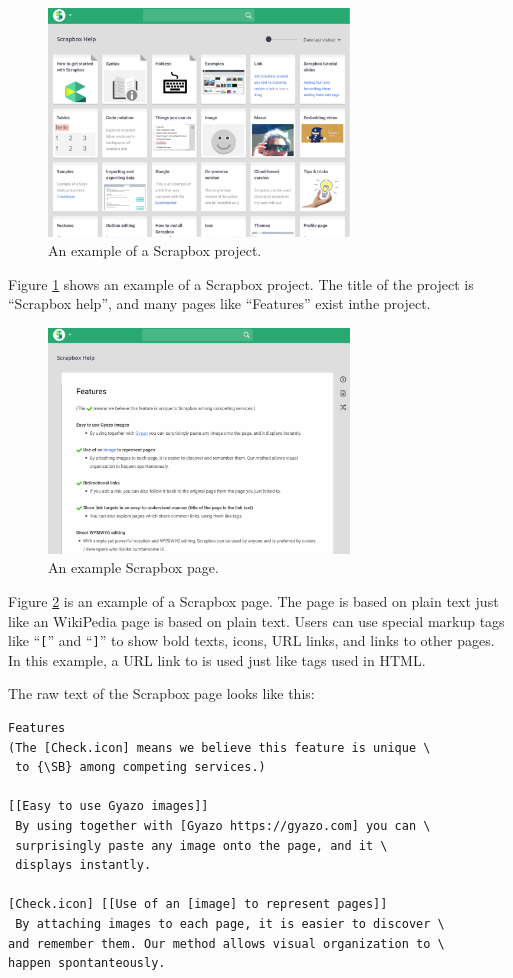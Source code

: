 \documentclass{article}
\def\SB{\textsf{\small Scrapbox}}
\begin{document}
\begin{figure}[H]
\centerline{\includegraphics[width=80mm,bb=0 0 1553 1174]{figures/28818d749896f87f3eb8bd6b6f9e9a36.png}}
\caption{An example of a {\SB} project.}
\label{exampleproject}
\end{figure}

Figure \ref{exampleproject} shows an example of a {\SB} project.
The title of the project is ``Scrapbox help'', and
many pages like ``Features'' exist inthe project.

\begin{figure}[H]
\centerline{\includegraphics[width=80mm,bb=0 0 1606 1200]{figures/9e867c325bafc415bd0870c1717fbaf7.png}}
\caption{An example {\SB} page.}
\label{examplepage}
\end{figure}

Figure \ref{examplepage} is an example of a {\SB} page.
%
The page is based on plain text just like an WikiPedia page is based on plain text.
Users can use special markup tags
like ``\texttt{[}'' and ``\texttt{]}'' to show bold texts, icons, URL links,
and links to other pages.
In this example, a URL link to {} is used
just like  tags used in HTML.

The raw text of the {\SB} page looks like this:

{\scriptsize
\begin{verbatim}
Features
(The [Check.icon] means we believe this feature is unique \
 to {\SB} among competing services.)

[[Easy to use Gyazo images]]
 By using together with [Gyazo https://gyazo.com] you can \
 surprisingly paste any image onto the page, and it \
 displays instantly.

[Check.icon] [[Use of an [image] to represent pages]]
 By attaching images to each page, it is easier to discover \
and remember them. Our method allows visual organization to \
happen spontanteously.
\end{verbatim}
}
\end{document}
